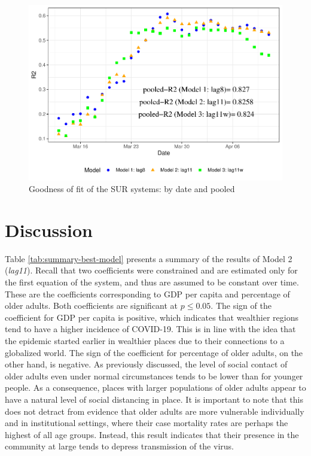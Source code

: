 \documentclass[]{elsarticle} %
\makeatletter
\def\maxwidth{\ifdim\Gin@nat@width>\linewidth\linewidth
\else\Gin@nat@width\fi}
\let\Oldincludegraphics\includegraphics
\renewcommand{\includegraphics}[1]{\Oldincludegraphics[width=\maxwidth]{#1}}
\makeatother
\begin{document}
\begin{figure}
\centering
\includegraphics{Environmental-Correlates-of-COVID19-Spain_files/figure-latex/goodness-of-fit-1.pdf}
\caption{\label{fig:goodness-of-fit} Goodness of fit of the SUR systems:
by date and pooled}
\end{figure}

\hypertarget{discussion}{%
\section{Discussion}\label{discussion}}

Table \ref{tab:summary-best-model} presents a summary of the results of
Model 2 (\emph{lag11}). Recall that two coefficients were constrained
and are estimated only for the first equation of the system, and thus
are assumed to be constant over time. These are the coefficients
corresponding to GDP per capita and percentage of older adults. Both
coefficients are significant at \(p\leq0.05\). The sign of the
coefficient for GDP per capita is positive, which indicates that
wealthier regions tend to have a higher incidence of COVID-19. This is
in line with the idea that the epidemic started earlier in wealthier
places due to their connections to a globalized world. The sign of the
coefficient for percentage of older adults, on the other hand, is
negative. As previously discussed, the level of social contact of older
adults even under normal circumstances tends to be lower than for
younger people. As a consequence, places with larger populations of
older adults appear to have a natural level of social distancing in
place. It is important to note that this does not detract from evidence
that older adults are more vulnerable individually and in institutional
settings, where their case mortality rates are perhaps the highest of
all age groups. Instead, this result indicates that their presence in
the community at large tends to depress transmission of the virus.
\end{document}
